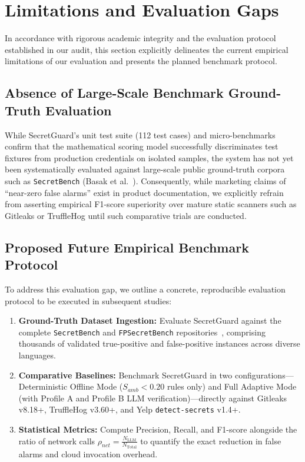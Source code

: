 \section{Limitations and Evaluation Gaps}
\label{sec:limitations}

In accordance with rigorous academic integrity and the evaluation protocol established in our audit, this section explicitly delineates the current empirical limitations of our evaluation and presents the planned benchmark protocol.

\subsection{Absence of Large-Scale Benchmark Ground-Truth Evaluation}
While SecretGuard's unit test suite (112 test cases) and micro-benchmarks confirm that the mathematical scoring model successfully discriminates test fixtures from production credentials on isolated samples, the system has not yet been systematically evaluated against large-scale public ground-truth corpora such as \texttt{SecretBench} (Basak et al.~\cite{basak2023comparative}). Consequently, while marketing claims of ``near-zero false alarms'' exist in product documentation, we explicitly refrain from asserting empirical F1-score superiority over mature static scanners such as Gitleaks or TruffleHog until such comparative trials are conducted.

\subsection{Proposed Future Empirical Benchmark Protocol}
To address this evaluation gap, we outline a concrete, reproducible evaluation protocol to be executed in subsequent studies:
\begin{enumerate}
    \item \textbf{Ground-Truth Dataset Ingestion:} Evaluate SecretGuard against the complete \texttt{SecretBench} and \texttt{FPSecretBench} repositories~\cite{basak2023comparative}, comprising thousands of validated true-positive and false-positive instances across diverse languages.
    \item \textbf{Comparative Baselines:} Benchmark SecretGuard in two configurations---Deterministic Offline Mode ($S_{amb} < 0.20$ rules only) and Full Adaptive Mode (with Profile A and Profile B LLM verification)---directly against Gitleaks v8.18+, TruffleHog v3.60+, and Yelp \texttt{detect-secrets} v1.4+.
    \item \textbf{Statistical Metrics:} Compute Precision, Recall, and F1-score alongside the ratio of network calls $\rho_{net} = \frac{N_{\text{LLM}}}{N_{\text{Total}}}$ to quantify the exact reduction in false alarms and cloud invocation overhead.
\end{enumerate}

